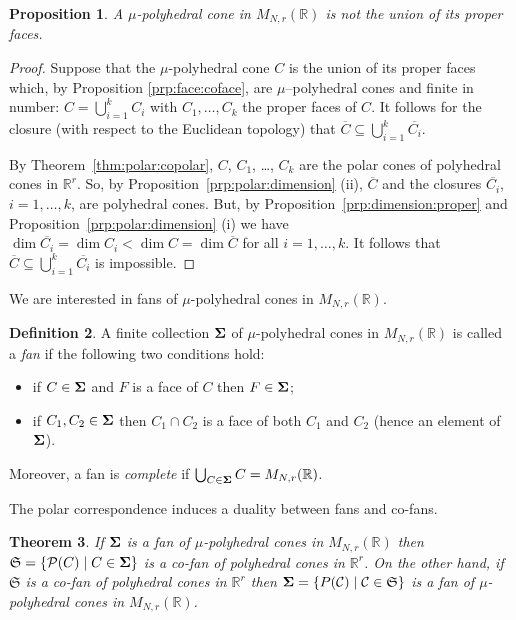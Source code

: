 \documentclass[12pt, a4article]{amsart}   	%
\numberwithin{equation}{section}
\theoremstyle{plain}
\newtheorem{theorem}{Theorem}[section]
\newtheorem{proposition}[theorem]{Proposition}
\theoremstyle{definition}
\newtheorem{definition}[theorem]{Definition}
\newcommand{\R}{{\mathbb R}}
\newcommand{\bfSigma}{{\bf \Sigma}}
\newcommand{\mcC}{{\mathcal C}}
\newcommand{\mcP}{{\mathcal P}}
\newcommand{\mfS}{{\mathfrak S}}
\newcommand{\MNaR}{M_{N,r}(\R)}
\begin{document}
\begin{proposition}\label{prp:cone:not:union}
A $\mu$-polyhedral cone in $\MNaR$ is not the union of its proper faces.
\end{proposition}
\begin{proof} Suppose that the $\mu$-polyhedral cone $C$ is the union of its proper faces which, by Proposition \ref{prp:face:coface}, are $\mu$--polyhedral cones and finite in number: $C = \bigcup_{i = 1 }^k C_i$ with $C_1,\ldots, C_k$ the proper faces of $C$. It follows for the closure (with respect to the Euclidean topology) that $\overline{C}\subseteq \bigcup_{i = 1 }^k \overline{C_i}$.
    
By Theorem~\ref{thm:polar:copolar}, $C$, $C_1$, \ldots, $C_k$ are the polar cones of polyhedral cones in $\mathbb R^r$. So, by Proposition~\ref{prp:polar:dimension} \textrm{(ii)}, $\overline{C}$ and the closures $\overline{C_i}$, $i = 1,\ldots,k$, are polyhedral cones. But, by Proposition~\ref{prp:dimension:proper} and Proposition~\ref{prp:polar:dimension} \textrm{(i)} we have $\dim \overline{C_i} = \dim C_i < \dim C = \dim \overline{C}$ for all $i=1,\ldots,k$. It follows that $\overline{C}\subseteq \bigcup_{i = 1 }^k \overline{C_i}$ is impossible.
\end{proof}

We are interested in fans of $\mu$-polyhedral cones in $\MNaR$.

\begin{definition}
A finite collection $\bfSigma$ of $\mu$-polyhedral cones in $\MNaR$ is called a \emph{fan} if the following two conditions hold:
\begin{itemize}
\item[(1)] if $C\in\bfSigma$ and $F$ is a face of $C$ then $F\in\bfSigma$;
\item[(2)] if $C_1,C_2\in\bfSigma$ then $C_1\cap C_2$ is a face of both $C_1$ and $C_2$ (hence an element of $\bfSigma$). 
\end{itemize}
Moreover, a fan is \emph{complete} if $\bigcup_{C\in\bfSigma}C = \MNaR$.
\end{definition}

The polar correspondence induces a duality between fans and co-fans.

\begin{theorem}\label{thm:fan:cofan}
If $\bfSigma$ is a fan of $\mu$-polyhedral cones in $\MNaR$ then $\mfS=\{\mcP(C) \mid C\in\bfSigma\}$ is a co-fan of polyhedral cones in $\R^r$. On the other hand, if $\mfS$ is a co-fan of polyhedral cones in $\R^r$ then $\bfSigma = \{P(\mcC) \mid \mcC\in\mfS\}$ is a fan of $\mu$-polyhedral cones in $\MNaR$.
\end{theorem}
\end{document}
